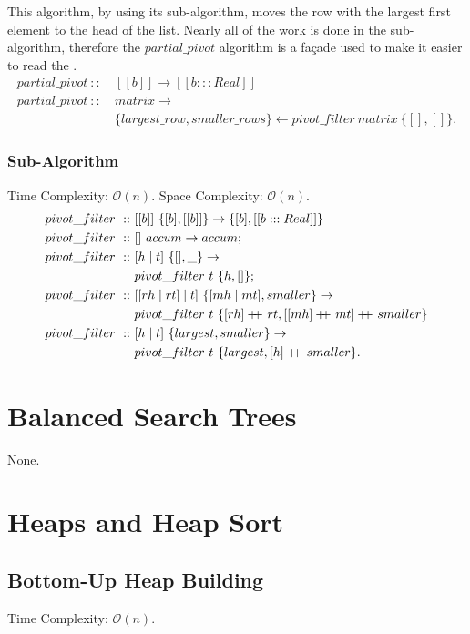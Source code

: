 \documentclass[a4paper,10pt]{book}
\newcommand\doubleplus{+\kern-1.3ex+\kern0.8ex}
\begin{document}
This algorithm, by using its sub-algorithm, moves the row with the largest first element to the head of the list. Nearly all of the work is done in the sub-algorithm, therefore the $partial\_pivot$ algorithm is a fa\c{c}ade used to make it easier to read the .
\begin{align*}
partial\_pivot\ ::\ &[[b]]\rightarrow[[b:::Real]]\\
partial\_pivot\ ::\ &matrix\rightarrow\\
	&\{largest\_row,smaller\_rows\}\leftarrow pivot\_filter\ matrix\ \{[],[]\}.
\end{align*}

\subsubsection{Sub-Algorithm}Time Complexity: $\mathcal{O}(n)$. Space Complexity: $\mathcal{O}(n)$.
\begin{align*}
pivot\_filter\ ::\ &[[b]]\ \{[b],[[b]]\}\rightarrow \{[b],[[b:::Real]]\}\\
pivot\_filter\ ::\ &[]\ accum\rightarrow accum;\\
pivot\_filter\ ::\ &[h\mid t]\ \{[],\_\}\rightarrow\\
	&pivot\_filter\ t\ \{h,[]\};\\
pivot\_filter\ ::\ &[[rh\mid rt]\mid t]\ \{[mh\mid mt],smaller\}\rightarrow\\
	&pivot\_filter\ t\ \{[rh]\doubleplus rt,[[mh]\doubleplus mt]\doubleplus smaller\}\\
pivot\_filter\ ::\ &[h\mid t]\ \{largest,smaller\}\rightarrow\\
	&pivot\_filter\ t\ \{largest,[h]\doubleplus smaller\}.
\end{align*}

\section{Balanced Search Trees}
None.
\section{Heaps and Heap Sort}

\subsection{Bottom-Up Heap Building}
Time Complexity: $\mathcal{O}(n)$.
\end{document}
